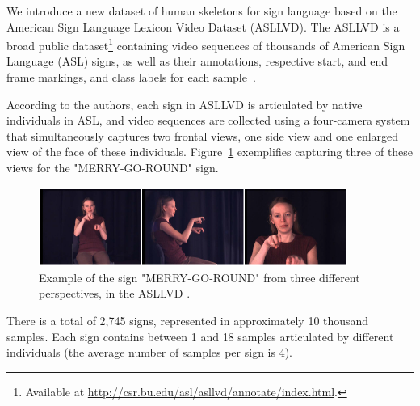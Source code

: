 We introduce a new dataset of human skeletons for sign language based on the American Sign Language Lexicon Video Dataset (ASLLVD). The ASLLVD  is a broad public dataset\footnote{ Available at \url{http://csr.bu.edu/asl/asllvd/annotate/index.html}.} containing video sequences of thousands of American Sign Language (ASL) signs, as well as their annotations, respective start, and end frame markings, and class labels for each sample~\cite{athitsos-asllvd-2008,neidle-2012}.

According to the authors, each sign in ASLLVD is articulated by native individuals in ASL, and video sequences are collected using a four-camera system that simultaneously captures two frontal views, one side view and one enlarged view of the face of these individuals. Figure~\ref{fig:asllvd-example} exemplifies capturing three of these views for the "MERRY-GO-ROUND" sign. 


\begin{figure}[!ht]
    \centering
    \includegraphics[width=0.9\textwidth]{images/asllvd_example}
    \caption{Example of the sign "MERRY-GO-ROUND" from three different perspectives, in the ASLLVD \cite[p. 2]{athitsos-asllvd-2008}.}
    \label{fig:asllvd-example}
\end{figure}

There is a total of 2,745 signs, represented in approximately 10 thousand samples. Each sign contains between 1 and 18 samples articulated by different individuals (the average number of samples per sign is 4). %


